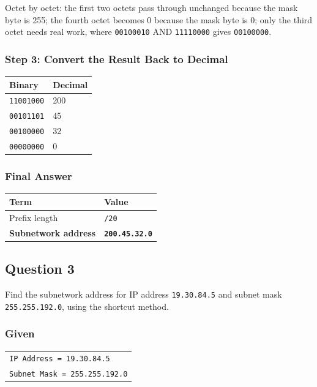 \documentclass[11pt,a4paper]{article}
\begin{document}
Octet by octet: the first two octets pass through unchanged because the mask byte
is 255; the fourth octet becomes 0 because the mask byte is 0; only the third
octet needs real work, where \texttt{00100010} AND \texttt{11110000} gives
\texttt{00100000}.

\subsubsection*{Step 3: Convert the Result Back to Decimal}

\begin{tabularx}{\textwidth}{@{}ll@{}}
\toprule
\rowcolor{tablehead}\textbf{Binary} & \textbf{Decimal} \\
\midrule
\texttt{11001000} & 200 \\
\texttt{00101101} & 45 \\
\texttt{00100000} & 32 \\
\texttt{00000000} & 0 \\
\bottomrule
\end{tabularx}

\subsubsection*{Final Answer}

\begin{tabularx}{\textwidth}{@{}lX@{}}
\toprule
\rowcolor{tablehead}\textbf{Term} & \textbf{Value} \\
\midrule
Prefix length & \texttt{/20} \\
\textbf{Subnetwork address} & \textbf{\texttt{200.45.32.0}} \\
\bottomrule
\end{tabularx}

\subsection*{Question 3}

Find the subnetwork address for IP address \texttt{19.30.84.5} and subnet mask
\texttt{255.255.192.0}, using the shortcut method.

\subsubsection*{Given}

\begin{tabularx}{\textwidth}{@{}X@{}}
\texttt{IP Address = 19.30.84.5} \\
\texttt{Subnet Mask = 255.255.192.0} \\
\end{tabularx}
\end{document}
